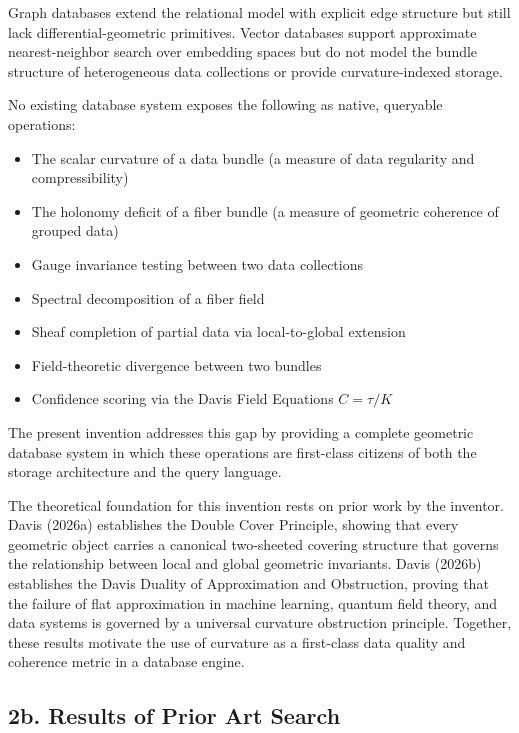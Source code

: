 \documentclass[11pt,letterpaper]{article}
\begin{document}
Graph databases extend the relational model with explicit edge structure but still lack differential-geometric primitives. Vector databases support approximate nearest-neighbor search over embedding spaces but do not model the bundle structure of heterogeneous data collections or provide curvature-indexed storage.

No existing database system exposes the following as native, queryable operations:
\begin{itemize}[nosep]
  \item The scalar curvature of a data bundle (a measure of data regularity and compressibility)
  \item The holonomy deficit of a fiber bundle (a measure of geometric coherence of grouped data)
  \item Gauge invariance testing between two data collections
  \item Spectral decomposition of a fiber field
  \item Sheaf completion of partial data via local-to-global extension
  \item Field-theoretic divergence between two bundles
  \item Confidence scoring via the Davis Field Equations $C = \tau/K$
\end{itemize}

The present invention addresses this gap by providing a complete geometric database system in which these operations are first-class citizens of both the storage architecture and the query language.

The theoretical foundation for this invention rests on prior work by the inventor. Davis (2026a) establishes the Double Cover Principle, showing that every geometric object carries a canonical two-sheeted covering structure that governs the relationship between local and global geometric invariants. Davis (2026b) establishes the Davis Duality of Approximation and Obstruction, proving that the failure of flat approximation in machine learning, quantum field theory, and data systems is governed by a universal curvature obstruction principle. Together, these results motivate the use of curvature as a first-class data quality and coherence metric in a database engine.


\subsection*{2b. Results of Prior Art Search}
\end{document}
